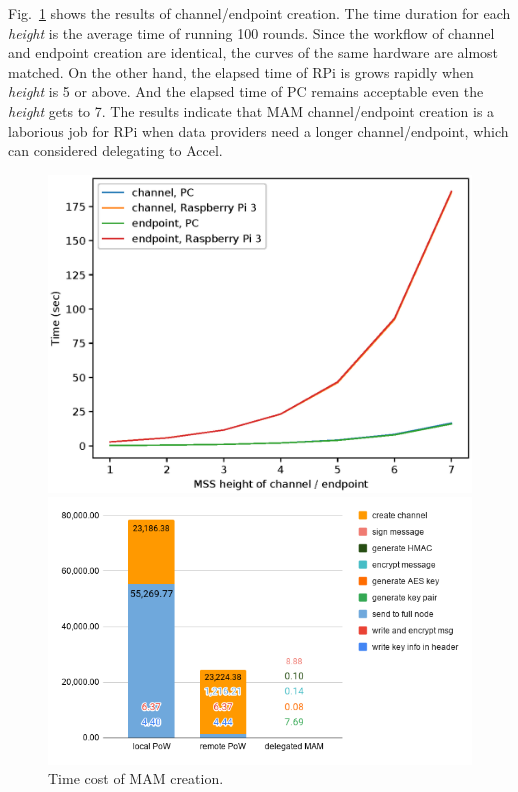 \documentclass[10pt, conference, compsocconf]{IEEEtran}
\begin{document}
Fig.~\ref{fig:mam_create} shows the results of channel/endpoint creation. The time duration for each \textit{height} is the average time of running 100 rounds. Since the workflow of channel and endpoint creation are identical, the curves of the same hardware are almost matched. On the other hand, the elapsed time of RPi is grows rapidly when \textit{height} is 5 or above. And the elapsed time of PC remains acceptable even the \textit{height} gets to 7. The results indicate that MAM channel/endpoint creation is a laborious job for RPi when data providers need a longer channel/endpoint, which can considered delegating to Accel.
\begin{figure}[!htb]
  \includegraphics[width=\linewidth]{mam_create}
  \caption{Time cost of MAM creation.}\label{fig:mam_create}
\endminipage\hfill
{}
  \includegraphics[width=\linewidth]{rpi3_pow}

\end{figure}
\end{document}
